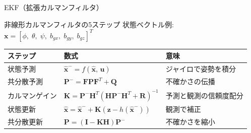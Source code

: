 \begin{frame}{EKF（拡張カルマンフィルタ）}
  \begin{block}{非線形カルマンフィルタの5ステップ}
    状態ベクトル例: $\mathbf{x} = [\phi,\;\theta,\;\psi,\;b_{gx},\;b_{gy},\;b_{gz}]^T$
  \end{block}

  \vspace{0.3em}

  {\small
  \begin{tabular}{lll}
    \hline
    \textbf{ステップ} & \textbf{数式} & \textbf{意味} \\
    \hline
    状態予測 & $\hat{\mathbf{x}}^- = f(\hat{\mathbf{x}},\,\mathbf{u})$ & ジャイロで姿勢を積分 \\
    共分散予測 & $\mathbf{P}^- = \mathbf{F}\mathbf{P}\mathbf{F}^T + \mathbf{Q}$ & 不確かさの伝播 \\
    カルマンゲイン & $\mathbf{K} = \mathbf{P}^-\mathbf{H}^T(\mathbf{H}\mathbf{P}^-\mathbf{H}^T + \mathbf{R})^{-1}$ & 予測と観測の信頼度配分 \\
    状態更新 & $\hat{\mathbf{x}} = \hat{\mathbf{x}}^- + \mathbf{K}(\mathbf{z} - h(\hat{\mathbf{x}}^-))$ & 観測で補正 \\
    共分散更新 & $\mathbf{P} = (\mathbf{I} - \mathbf{K}\mathbf{H})\mathbf{P}^-$ & 不確かさを縮小 \\
    \hline
  \end{tabular}
  }
\end{frame}

